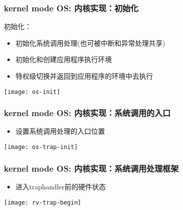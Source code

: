 \begin{frame}
    \frametitle{kernel mode OS: 内核实现：初始化}
    初始化：
    \begin{itemize}
        
        \item 初始化系统调用处理(也可被中断和异常处理共享)
        \item 初始化和创建应用程序执行环境
        \item 特权级切换并返回到应用程序的环境中去执行
        
    \end{itemize}	
        \centering
        \texttt{[image: os-init]}
\end{frame}

\begin{frame}
    \frametitle{kernel mode OS: 内核实现：系统调用的入口}
    
    \begin{itemize}
        
        \item 设置系统调用处理的入口位置

        
    \end{itemize}	
    \centering
    \texttt{[image: os-trap-init]}
\end{frame}

\begin{frame}
    \frametitle{kernel mode OS: 内核实现：系统调用处理框架}
    
    \begin{itemize}
        
        \item 进入trap\-handler前的硬件状态
        
        
    \end{itemize}	
    \centering
    \texttt{[image: rv-trap-begin]}
\end{frame}

